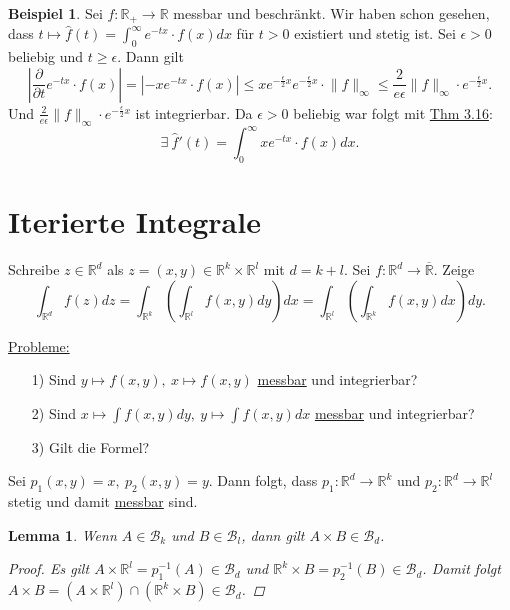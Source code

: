 \documentclass[a4paper]{report}
\newcommand{\R}{\mathbb{R}}
\newcommand{\Rq}{\overline{\R}}
\newcommand{\Borel}{\mathcal{B}}
\newcommand{\Bd}{\Borel_d}
\newcommand{\jlabel}[1]{\label{j_#1}}
\newcommand{\jhyperref}[2]{\hyperref[j_#1]{#2}}
\newcommand{\jlink}[1]{\jhyperref{#1}{#1}}
\newcommand{\jabb}[3]{ #1: #2 \rightarrow #3 }
\theoremstyle{plain}
\newtheorem{lem}[thm]{Lemma}
\theoremstyle{definition}
\newtheorem*{expl*}{Beispiel}
\begin{document}
{{{{\begin{expl*}
    Sei $\jabb{f}{\R_+}{\R}$ messbar und beschränkt. Wir haben schon gesehen, dass $t\mapsto \hat{f}(t) = \int_0^\infty e^{-tx}\cdot f(x)dx$ für $t>0$ existiert und stetig ist. Sei $\epsilon >0$ beliebig und $t\ge \epsilon$. Dann gilt
    \begin{displaymath}
        \left | \frac{\partial}{\partial t} e^{-tx} \cdot f(x) \right | = \left | -x e^{-tx}\cdot f(x) \right |\le xe^{-\frac{\epsilon}{2}x} e^{-\frac{\epsilon}{2}x} \cdot \lVert f \rVert_\infty \le \frac{2}{e\epsilon} \lVert f\rVert_\infty\cdot e^{-\frac{\epsilon}{2}x}.
    \end{displaymath}
    Und $\frac{2}{e\epsilon} \lVert f\rVert_\infty\cdot e^{-\frac{\epsilon}{2}x}$ ist integrierbar. Da $\epsilon>0$ beliebig war folgt mit \jlink{Thm 3.16}:
    \begin{displaymath}
        \exists \ \hat{f}'(t) = \int_0^\infty xe^{-tx}\cdot f(x) dx.
    \end{displaymath}
\end{expl*}
        
\section{Iterierte Integrale}
Schreibe $z\in \R^d$ als $z=(x,y) \in \R^k \times \R^l$ mit $d= k+l$. Sei $\jabb{f}{\R^d}{\Rq}$. Zeige
\begin{displaymath}
    \int_{\R^d} f(z) dz = \int_{\R^k} \left( \int_{\R^l} f(x,y) dy \right) dx = \int_{\R^l}\left( \int_{\R^k} f(x,y) dx \right) dy.
\end{displaymath}

\vspace{12pt}

\uline{Probleme:}
\begin{itemize}
    \item[1)] Sind $y\mapsto f(x,y), \ x\mapsto f(x,y)$ \jlink{messbar} und integrierbar?
    \item[2)] Sind $x \mapsto \int f(x,y)dy, \ y\mapsto \int f(x,y)dx$ \jlink{messbar} und integrierbar?
    \item[3)] Gilt die Formel?
\end{itemize}

Sei $p_1(x,y) = x, \ p_2(x,y)=y$. Dann folgt, dass $\jabb{p_1}{\R^d}{\R^k}$ und $ \jabb{p_2}{\R^d}{\R^l}$ stetig und damit \jlink{messbar} sind.

\begin{lem}
\jlabel{Lem 3.17}
    Wenn $A\in \Borel_k$ und $B \in \Borel_l$, dann gilt $A\times B \in \Bd$.
    \begin{proof}
        Es gilt $A\times \R^l = p_1^{-1}(A)\in \Bd$ und $\R^k \times B = p_2^{-1}(B) \in \Bd$. Damit folgt $A\times B = (A\times \R^l)\cap (\R^k\times B) \in \Bd$.
    \end{proof}
\end{lem}

}}}}
\end{document}
